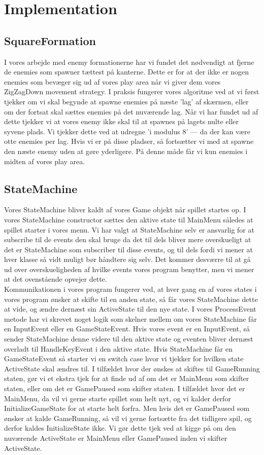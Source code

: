 \section{Implementation}
\subsection{SquareFormation}
I vores arbejde med enemy formationerne har vi fundet det nødvendigt at fjerne de enemies som spawner tættest på kanterne. Dette er for at der ikke er nogen enemies som bevæger sig ud af vores play area når vi giver dem vores ZigZagDown movement strategy. I praksis fungerer vores algoritme ved at vi først tjekker om vi skal begynde at spawne enemies på næste 'lag' af skærmen, eller om der fortsat skal sættes enemies på det nuværende lag. Når vi har fundet ud af dette tjekker vi at vores enemy ikke skal til at spawnes på lagets nulte eller syvene plads. Vi tjekker dette ved at udregne 'i modulus 8' --- da der kan være otte enemies per lag. Hvis vi er på disse pladser, så fortsætter vi med at spawne den næste enemy uden at gøre yderligere. På denne måde får vi kun enemies i midten af vores play area.

\subsection{StateMachine}
Vores StateMachine bliver kaldt af vores Game objekt når spillet startes op. I vores StateMachine constructor sættes den aktive state til MainMenu således at spillet starter i vores menu. Vi har valgt at StateMachine selv er ansvarlig for at subscribe til de events den skal bruge da det til dels bliver mere overskueligt at det er StateMachine som subscriber til disse events, og til dels fordi vi mener at hver klasse så vidt muligt bør håndtere sig selv. Det kommer desværre til at gå ud over overskueligheden af hvilke events vores program benytter, men vi mener at det ovenstående opvejer dette.\\
Kommunikationen i vores program fungerer ved, at hver gang en af vores states i vores program ønsker at skifte til en anden state, så får vores StateMachine dette at vide, og ændre dernæst sin ActiveState til den nye state. I vores ProcessEvent metode har vi skrevet noget logik som skelner mellem om vores StateMachine får en InputEvent eller en GameStateEvent. Hvis vores event er en InputEvent, så sender StateMachine denne videre til den aktive state og eventen bliver dernæst overladt til HandleKeyEvent i den aktive state. Hvis StateMachine får en GameStateEvent så starter vi en switch case hvor vi tjekker for hvilken state ActiveState skal ændres til. I tilfældet hvor der ønskes at skiftes til GameRunning staten, gør vi et ekstra tjek for at finde ud af om det er MainMenu som skifter staten, eller om det er GamePaused som skifter staten. I tilfældet hvor det er MainMenu, da vil vi gerne starte spillet som helt nyt, og vi kalder derfor InitializeGameState for at starte helt forfra. Men hvis det er GamePaused som ønsker at kalde GameRunning, så vil vi gerne fortsætte fra det tidligere spil, og derfor kaldes InitializeState ikke. Vi gør dette tjek ved at kigge på om den nuværende ActiveState er MainMenu eller GamePaused inden vi skifter ActiveState.
